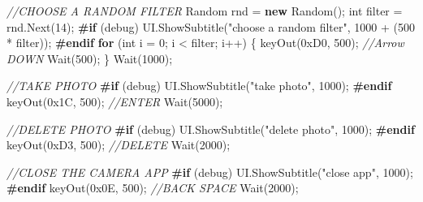 \documentclass[
  openany]{book}
\newenvironment{Shaded}{\begin{snugshade}}{\end{snugshade}}
\newcommand{\BaseNTok}[1]{\textcolor[rgb]{0.00,0.00,0.81}{#1}}
\newcommand{\CommentTok}[1]{\textcolor[rgb]{0.56,0.35,0.01}{\textit{#1}}}
\newcommand{\DataTypeTok}[1]{\textcolor[rgb]{0.13,0.29,0.53}{#1}}
\newcommand{\DecValTok}[1]{\textcolor[rgb]{0.00,0.00,0.81}{#1}}
\newcommand{\FunctionTok}[1]{\textcolor[rgb]{0.00,0.00,0.00}{#1}}
\newcommand{\KeywordTok}[1]{\textcolor[rgb]{0.13,0.29,0.53}{\textbf{#1}}}
\newcommand{\NormalTok}[1]{#1}
\newcommand{\StringTok}[1]{\textcolor[rgb]{0.31,0.60,0.02}{#1}}
\begin{document}
\begin{Shaded}
\begin{Highlighting}[]
                    \CommentTok{//CHOOSE A RANDOM FILTER}
\NormalTok{                    Random rnd = }\KeywordTok{new} \FunctionTok{Random}\NormalTok{();}
                    \DataTypeTok{int}\NormalTok{ filter = rnd.}\FunctionTok{Next}\NormalTok{(}\DecValTok{14}\NormalTok{);}
\KeywordTok{#if}\NormalTok{ (debug)}
\NormalTok{                    UI.}\FunctionTok{ShowSubtitle}\NormalTok{(}\StringTok{"choose a random filter"}\NormalTok{, }\DecValTok{1000}\NormalTok{ + (}\DecValTok{500}\NormalTok{ * filter));}
\KeywordTok{#endif}
                    \KeywordTok{for}\NormalTok{ (}\DataTypeTok{int}\NormalTok{ i = }\DecValTok{0}\NormalTok{; i < filter; i++)}
\NormalTok{                    \{}
                        \FunctionTok{keyOut}\NormalTok{(}\BaseNTok{0xD0}\NormalTok{, }\DecValTok{500}\NormalTok{); }\CommentTok{//Arrow DOWN}
                        \FunctionTok{Wait}\NormalTok{(}\DecValTok{500}\NormalTok{);}
\NormalTok{                    \}}
                    \FunctionTok{Wait}\NormalTok{(}\DecValTok{1000}\NormalTok{);}

                    \CommentTok{//TAKE PHOTO}
\KeywordTok{#if}\NormalTok{ (debug)}
\NormalTok{                    UI.}\FunctionTok{ShowSubtitle}\NormalTok{(}\StringTok{"take photo"}\NormalTok{, }\DecValTok{1000}\NormalTok{);}
\KeywordTok{#endif}
                    \FunctionTok{keyOut}\NormalTok{(}\BaseNTok{0x1C}\NormalTok{, }\DecValTok{500}\NormalTok{); }\CommentTok{//ENTER}
                    \FunctionTok{Wait}\NormalTok{(}\DecValTok{5000}\NormalTok{);}

                    \CommentTok{//DELETE PHOTO}
\KeywordTok{#if}\NormalTok{ (debug)}
\NormalTok{                    UI.}\FunctionTok{ShowSubtitle}\NormalTok{(}\StringTok{"delete photo"}\NormalTok{, }\DecValTok{1000}\NormalTok{);}
\KeywordTok{#endif}
                    \FunctionTok{keyOut}\NormalTok{(}\BaseNTok{0xD3}\NormalTok{, }\DecValTok{500}\NormalTok{); }\CommentTok{//DELETE}
                    \FunctionTok{Wait}\NormalTok{(}\DecValTok{2000}\NormalTok{);}

                    \CommentTok{//CLOSE THE CAMERA APP}
\KeywordTok{#if}\NormalTok{ (debug)}
\NormalTok{                    UI.}\FunctionTok{ShowSubtitle}\NormalTok{(}\StringTok{"close app"}\NormalTok{, }\DecValTok{1000}\NormalTok{);}
\KeywordTok{#endif}
                    \FunctionTok{keyOut}\NormalTok{(}\BaseNTok{0x0E}\NormalTok{, }\DecValTok{500}\NormalTok{); }\CommentTok{//BACK SPACE}
                    \FunctionTok{Wait}\NormalTok{(}\DecValTok{2000}\NormalTok{);}


\end{Highlighting}
\end{Shaded}
\end{document}
